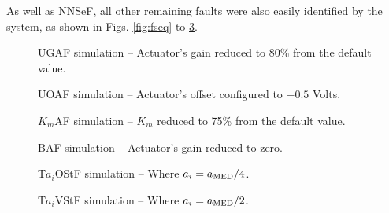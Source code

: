 \documentclass[10pt,fleqn,a4paper]{article}
\begin{document}
As well as NNSeF, all other remaining faults were also easily identified by the
system, as shown in Figs. \ref{fig:fseq} to \ref{fig:fsivros}.

\begin{figure}[htb]
    \begin{minipage}[b]{0.48\linewidth}
        \scalebox{0.65}{}
        \vspace{0.5cm}
        \caption{UGAF simulation -- Actuator's gain reduced to 80\% from the
                 default value.}
        \label{fig:fadg}
    \end{minipage}
    \hfill
    \begin{minipage}[b]{0.48\linewidth}
        \scalebox{0.65}{}
        \vspace{0.5cm}
        \caption{UOAF simulation -- Actuator's offset configured to $-0.5$
                 Volts.}
        \label{fig:fado}
    \end{minipage}
\end{figure}

\begin{figure}[htb]
    \begin{minipage}[b]{0.48\linewidth}
        \scalebox{0.65}{}
        \vspace{0.5cm}
        \caption{$K_m$AF simulation -- $K_m$ reduced to 75\% from the default
                 value.}
        \label{fig:favk}
    \end{minipage}
    \hfill
    \begin{minipage}[b]{0.48\linewidth}
        \scalebox{0.65}{}
        \vspace{0.5cm}
        \caption{BAF simulation -- Actuator's gain reduced to zero.}
        \label{fig:faq}
    \end{minipage}
\end{figure}

\begin{figure}[htb]
    \begin{minipage}[b]{0.48\linewidth}
        \scalebox{0.65}{}
        \vspace{0.5cm}
        \caption{T$a_i$OStF simulation -- Where $a_i = a_{\tiny \text{MED}}/4$.}
        \label{fig:fsieos}
    \end{minipage}
    \hfill
    \begin{minipage}[b]{0.48\linewidth}
        \scalebox{0.65}{}
        \vspace{0.5cm}
        \caption{T$a_i$VStF simulation -- Where $a_i = a_{\tiny \text{MED}}/2$.}
        \label{fig:fsivros}
    \end{minipage}
\end{figure}
\end{document}

